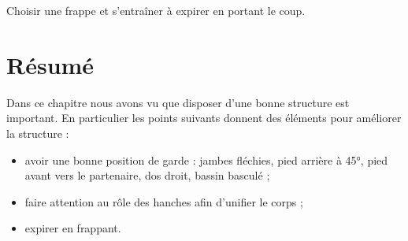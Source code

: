 \begin{exercice}


	Choisir une frappe et s'entraîner à expirer en portant le coup.
\end{exercice}


\section{Résumé}


Dans ce chapitre nous avons vu que disposer d'une bonne structure est important.
En particulier les points suivants donnent des éléments pour améliorer la structure :
\begin{itemize}
	\item avoir une bonne position de garde : jambes fléchies, pied arrière à 45°, pied avant vers le partenaire, dos droit, bassin basculé ;
	\item faire attention au rôle des hanches afin d'unifier le corps ;
	\item expirer en frappant.
\end{itemize}

